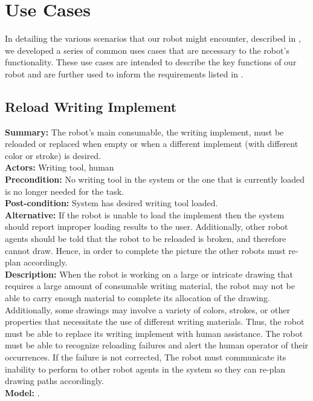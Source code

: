 
\section{Use Cases}
\label{sec:use_cases}
In detailing the various scenarios that our robot might encounter, described in , we developed a series of common uses cases that are necessary to the robot's functionality. These use cases are intended to describe the key functions of our robot and are further used to inform the requirements listed in .

\subsection{Reload Writing Implement}
\textbf{Summary:} The robot's main consumable, the writing implement, must be reloaded or replaced when empty or when a different implement (with different color or stroke) is desired. \\
\textbf{Actors:}  Writing tool, human \\
\textbf{Precondition:} No writing tool in the system or the one that is currently loaded is no longer needed for the task. \\
\textbf{Post-condition:} System has desired writing tool loaded. \\
\textbf{Alternative:} If the robot is unable to load the implement then the system should report improper loading results to the user. Additionally, other robot agents should be told that the robot to be reloaded is broken, and therefore cannot draw. Hence, in order to complete the picture the other robots must re-plan accordingly. \\
\textbf{Description:} When the robot is working on a large or intricate drawing that requires a large amount of consumable writing material, the robot may not be able to carry enough material to complete its allocation of the drawing. Additionally, some drawings may involve a variety of colors, strokes, or other properties that necessitate the use of different writing materials. Thus, the robot must be able to replace its writing implement with human assistance. The robot must be able to recognize reloading failures and alert the human operator of their occurrences. If the failure is not corrected, The robot must communicate its inability to perform to other robot agents in the system so they can re-plan drawing paths accordingly. \\
\textbf{Model:} .\\

